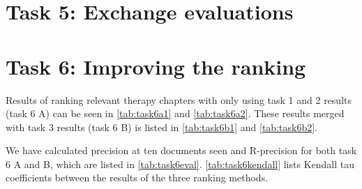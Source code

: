 \section{Task 5: Exchange evaluations}


\section{Task 6: Improving the ranking}
Results of ranking relevant therapy chapters with only using task 1 and 2
results (task 6 A) can be seen in \autoref{tab:task6a1} and
\autoref{tab:task6a2}. These results merged with task 3 results (task 6 B)
is listed in \autoref{tab:task6b1} and \autoref{tab:task6b2}.

We have calculated precision at ten documents seen and R-precision for both
task 6 A and B, which are listed in \autoref{tab:task6eval}.
\autoref{tab:task6kendall} lists Kendall tau coefficients between the results
of the three ranking methods.

